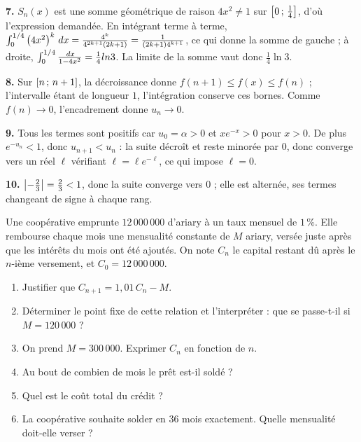 \begin{corrige}[annales]
\textbf{7.} $S_{n}(x)$ est une somme géométrique de raison $4x^{2} \neq 1$ sur
$\left[0\,;\,\frac14\right]$, d'où l'expression demandée. En intégrant terme à
terme, $\int_{0}^{1/4}\left(4x^{2}\right)^{k}\,dx
= \frac{4^{k}}{4^{2k+1}(2k+1)} = \frac{1}{(2k+1)4^{k+1}}$, ce qui donne la
somme de gauche ; à droite, $\int_{0}^{1/4}\frac{\,dx}{1-4x^{2}}
= \frac14ln3$. La limite de la somme vaut donc $\frac14\ln3$.

\textbf{8.} Sur $\left[n\,;\,n+1\right]$, la décroissance donne
$f(n+1) \leq f(x) \leq f(n)$ ; l'intervalle étant de longueur $1$,
l'intégration conserve ces bornes. Comme $f(n) \to 0$, l'encadrement donne
$u_{n} \to 0$.

\textbf{9.} Tous les termes sont positifs car $u_{0} = \alpha>0$ et
$xe^{-x}>0$ pour $x>0$. De plus $e^{-u_{n}}<1$, donc $u_{n+1}<u_{n}$ : la
suite décroît et reste minorée par $0$, donc converge vers un réel $\ell$
vérifiant $\ell = \ell e^{-\ell}$, ce qui impose $\ell = 0$.

\textbf{10.} $\left|-\frac23\right| = \frac23<1$, donc la suite converge vers $0$ ;
elle est alternée, ses termes changeant de signe à chaque rang.
\end{corrige}

\begin{jecherche}
Une coopérative emprunte $12\,000\,000$ d'ariary à un taux mensuel de
$1\,\%$. Elle rembourse chaque mois une mensualité constante de $M$ ariary,
versée juste après que les intérêts du mois ont été ajoutés. On note $C_{n}$
le capital restant dû après le $n$-ième versement, et $C_{0} = 12\,000\,000$.

\begin{enumerate}[label=\textbf{\arabic*.}, leftmargin=*, itemsep=0.3em]
  \item Justifier que $C_{n+1} = 1{,}01\,C_{n}-M$.
  \item Déterminer le point fixe de cette relation et l'interpréter : que se
        passe-t-il si $M = 120\,000$ ?
  \item On prend $M = 300\,000$. Exprimer $C_{n}$ en fonction de $n$.
  \item Au bout de combien de mois le prêt est-il soldé ?
  \item Quel est le coût total du crédit ?
  \item La coopérative souhaite solder en $36$ mois exactement. Quelle
        mensualité doit-elle verser ?
\end{enumerate}
\end{jecherche}

